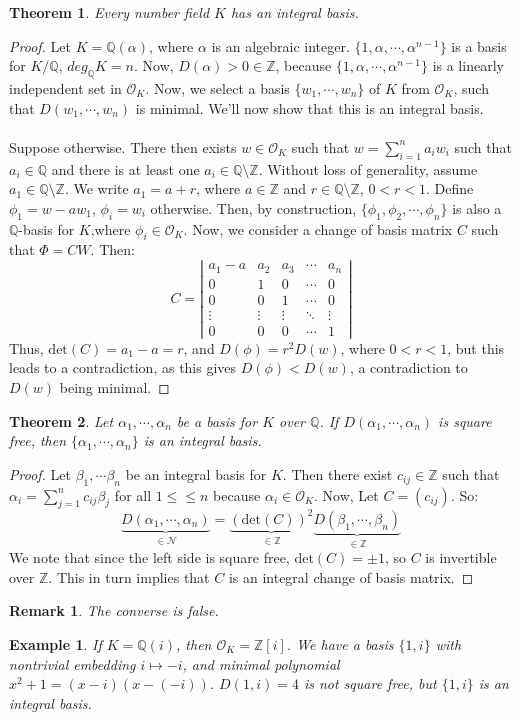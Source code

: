 \documentclass{article}
\newcommand{\air}{\mathcal{O}_K}
\newcommand{\Q}{\mathbb{Q}}
\newcommand{\Z}{\mathbb{Z}}
\newcommand{\N}{\mathcal{N}}
\newtheorem{theorem}{Theorem}[subsection]
\newtheorem{remark}{Remark}[subsection]
\newtheorem{example}{Example}[subsection]
\begin{document}
\begin{theorem}
Every number field $K$ has an integral basis.
\end{theorem}
\begin{proof}
Let $K=\Q(\alpha)$, where $\alpha$ is an algebraic integer. $\{1,\alpha,\cdots, \alpha^{n-1}\}$ is a basis for $K/\Q$, $deg_\Q K=n$. Now, $D(\alpha)>0 \in\Z$, because $\{1,\alpha,\cdots, \alpha^{n-1}\}$ is a linearly independent set in $\air$. Now, we select a basis $\{w_1,\cdots, w_n\}$ of $K$ from $\air$, such that $D(w_1,\cdots, w_n)$ is minimal. We'll now show that this is an integral basis. \\
\\
Suppose otherwise. There then exists $w\in\air$ such that $w=\displaystyle\sum_{i=1}^n a_iw_i$ such that $a_i\in\Q$ and there is at least one $a_i\in \Q\setminus \Z$. Without loss of generality, assume $a_1\in \Q\setminus \Z$. We write $a_1=a+r$, where $a\in\Z$ and $r\in \Q\setminus \Z$, $0<r<1$. Define $\phi_1=w-aw_1$, $\phi_i=w_i$ otherwise. Then, by construction, $\{\phi_1,\phi_2,\cdots, \phi_n\}$ is also a $\Q$-basis for $K$,where $\phi_i\in\air$. Now, we consider a change of basis matrix $C$ such that $\Phi=CW$. Then:
$$C=\left|\begin{array}{ccccc}
   a_1-a  & a_2 & a_3 &\cdots &a_n \\
   0  & 1 & 0 &\cdots &0\\
   0 & 0 & 1 & \cdots &0\\
   \vdots & \vdots &\vdots &\ddots &\vdots\\
   0 & 0 & 0 & \cdots & 1
\end{array}\right|$$
Thus, $\text{det}(C)=a_1-a=r$, and $D(\phi)=r^2D(w)$, where $0<r<1$, but this leads to a contradiction, as this gives $D(\phi)<D(w)$, a contradiction to $D(w)$ being minimal.
\end{proof}
\begin{theorem}
Let $\alpha_1,\cdots, \alpha_n$ be a basis for $K$ over $\Q$. If $D(\alpha_1,\cdots, \alpha_n)$ is square free, then $\{\alpha_1,\cdots, \alpha_n\}$ is an integral basis.
\end{theorem}
\begin{proof}
Let $\beta_1,\cdots \beta_n$ be an integral basis for $K$. Then there exist $c_{ij}\in\Z$ such that $\alpha_i=\displaystyle\sum_{j=1}^n c_{ij}\beta_j$ for all $1\leq \leq n$ because $\alpha_i\in\air$. Now, Let $C=(c_{ij})$. So:
$$\underbrace{D(\alpha_1,\cdots, \alpha_n)}_{\in\N}=\underbrace{(\text{det}(C))^2}_{\in\Z}\underbrace{D(\beta_1,\cdots, \beta_n)}_{\in\Z}$$
We note that since the left side is square free, $\text{det}(C)=\pm 1$, so $C$ is invertible over $\Z.$ This in turn implies that $C$ is an integral change of basis matrix.
\end{proof}
\begin{remark}
The converse is false.
\end{remark}
\begin{example}
If $K=\Q(i)$, then $\air = \Z[i]$. We have a basis $\{1,i\}$ with nontrivial embedding $i\mapsto -i$, and minimal polynomial $x^2+1=(x-i)(x-(-i))$. $D(1,i)=4$ is not square free, but $\{1,i\}$ is an integral basis.
\end{example}
\end{document}
